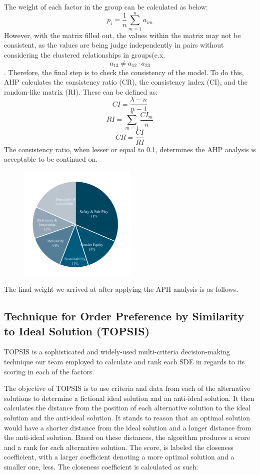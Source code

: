 \documentclass[12pt]{article}
\begin{document}
The weight of each factor in the group can be calculated as below:
\[
p_{i}=\frac{1}{n}\sum_{m=1}^{n}a_{im}
\] 
 However, with the matrix filled out, the values within the matrix may not be consistent, as the values are being judge independently in pairs without considering the clustered relationships in groups(e.x. \[a_{13}\neq a_{12} \cdot a_{23}\]. Therefore, the final step is to check the consistency of the model. To do this, AHP calculates the consistency ratio (CR), the consistency index (CI), and the random-like matrix (RI). These can be defined as:
 \[
 CI=\frac{\lambda-n}{n-1}
 \]
 \[
 RI=\sum_{m=1}^{n}\frac{CI_{m}}{n}
 \]
 \[
 CR=\frac{CI}{RI}
 \]
 The consistency ratio, when lesser or equal to 0.1, determines the AHP analysis is acceptable to be continued on. 
\begin{figure}[H]
    \centering
    \includegraphics[width=0.5\textwidth]{pigraph (1).png}
    \caption{\label{fig:pigraph} }
\end{figure}
 The final weight we arrived at after applying the APH analysis is as follows.

\subsection {Technique for Order Preference by Similarity to Ideal Solution (TOPSIS)}
TOPSIS is a sophisticated and widely-used multi-criteria decision-making technique our team employed to calculate and rank each SDE in regards to its scoring in each of the factors. 

The objective of TOPSIS is to use criteria and data from each of the alternative solutions to determine a fictional ideal solution and an anti-ideal solution. It then calculates the distance from the position of each alternative solution to the ideal solution and the anti-ideal solution. It stands to reason that an optimal solution would have a shorter distance from the ideal solution and a longer distance from the anti-ideal solution. Based on these distances, the algorithm produces a score and a rank for each alternative solution. The score, is labeled the closeness coefficient, with a larger coefficient denoting a more optimal solution and a smaller one, less.
The closeness coefficient is calculated as such:
\end{document}
